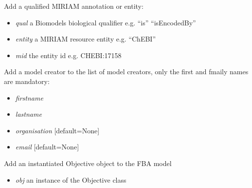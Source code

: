 \documentclass[a4paper,11pt,english]{sphinxmanual}
\begin{document}
\begin{fulllineitems}
\begin{fulllineitems}
\begin{itemize}
\end{itemize}

\end{fulllineitems}


\begin{fulllineitems}
\label{modules_doc:cbmpy.CBModel.Model.addMIRIAMannotation}
Add a qualified MIRIAM annotation or entity:
\begin{itemize}
\item {} 
\emph{qual} a Biomodels biological qualifier e.g. ``is'' ``isEncodedBy''

\item {} 
\emph{entity} a MIRIAM resource entity e.g. ``ChEBI''

\item {} 
\emph{mid} the entity id e.g. CHEBI:17158

\end{itemize}

\end{fulllineitems}


\begin{fulllineitems}
\label{modules_doc:cbmpy.CBModel.Model.addModelCreator}
Add a model creator to the list of model creators, only the first and fmaily names are mandatory:
\begin{itemize}
\item {} 
\emph{firstname}

\item {} 
\emph{lastname}

\item {} 
\emph{organisation} {[}default=None{]}

\item {} 
\emph{email}  {[}default=None{]}

\end{itemize}

\end{fulllineitems}


\begin{fulllineitems}
\label{modules_doc:cbmpy.CBModel.Model.addObjective}
Add an instantiated Objective object to the FBA model
\begin{itemize}
\item {} 
\emph{obj} an instance of the Objective class


\end{itemize}
\end{fulllineitems}
\end{fulllineitems}
\end{document}
